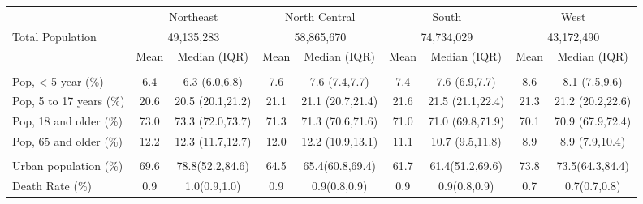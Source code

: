 \begin{tabular}{p{10em}cccccccc}
\toprule
& \multicolumn{2}{c}{Northeast} & \multicolumn{2}{c}{North Central} & \multicolumn{2}{c}{South} & \multicolumn{2}{c}{West} \\
\cmidrule(l{3pt}r{3pt}){2-3} \cmidrule(l{3pt}r{3pt}){4-5} \cmidrule(l{3pt}r{3pt}){6-7} \cmidrule(l{3pt}r{3pt}){8-9}
Total Population
& \multicolumn{2}{c}{49,135,283}
& \multicolumn{2}{c}{58,865,670}
& \multicolumn{2}{c}{74,734,029}
& \multicolumn{2}{c}{43,172,490}
\\
\cmidrule(l{3pt}r{3pt}){2-3} \cmidrule(l{3pt}r{3pt}){4-5} \cmidrule(l{3pt}r{3pt}){6-7} \cmidrule(l{3pt}r{3pt}){8-9}
& Mean & Median (IQR) & Mean & Median (IQR) & Mean & Median (IQR) & Mean & Median (IQR) \\
\midrule
\addlinespace[0.3em]
\multicolumn{1}{c}{\textit{Population Share by Age}} &&&&&&&& \\
Pop, < 5 year (\%)
& 6.4&6.3 (6.0,6.8)
& 7.6&7.6 (7.4,7.7)
& 7.4&7.6 (6.9,7.7)
& 8.6&8.1 (7.5,9.6)
\\
Pop, 5 to 17 years (\%)
& 20.6&20.5 (20.1,21.2)
& 21.1&21.1 (20.7,21.4)
& 21.6&21.5 (21.1,22.4)
& 21.3&21.2 (20.2,22.6)
\\
Pop, 18 and older (\%)
& 73.0&73.3 (72.0,73.7)
& 71.3&71.3 (70.6,71.6)
& 71.0&71.0 (69.8,71.9)
& 70.1&70.9 (67.9,72.4)
\\
Pop, 65 and older (\%)
& 12.2&12.3 (11.7,12.7)
& 12.0&12.2 (10.9,13.1)
& 11.1&10.7 (9.5,11.8)
& 8.9&8.9 (7.9,10.4)
\\
\addlinespace[0.3em]
\multicolumn{1}{c}{\textit{Others}} &&&&&&&& \\
Urban population (\%)
& 69.6&78.8(52.2,84.6)
& 64.5&65.4(60.8,69.4)
& 61.7&61.4(51.2,69.6)
& 73.8&73.5(64.3,84.4)
\\
Death Rate (\%)
& 0.9&1.0(0.9,1.0)
& 0.9&0.9(0.8,0.9)
& 0.9&0.9(0.8,0.9)
& 0.7&0.7(0.7,0.8)
\\
\bottomrule
\end{tabular}
